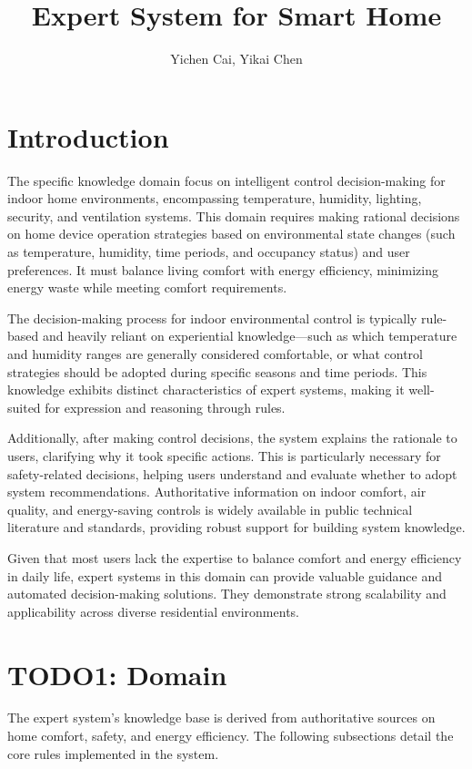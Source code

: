 \documentclass{article}
\title{Expert System for Smart Home}
\author{Yichen Cai, Yikai Chen}
\date{}
\begin{document}
\maketitle

\section{Introduction}

The specific knowledge domain focus on intelligent control decision-making for indoor home environments, encompassing temperature, humidity, lighting, security, and ventilation systems. This domain requires making rational decisions on home device operation strategies based on environmental state changes (such as temperature, humidity, time periods, and occupancy status) and user preferences. It must balance living comfort with energy efficiency, minimizing energy waste while meeting comfort requirements.

The decision-making process for indoor environmental control is typically rule-based and heavily reliant on experiential knowledge—such as which temperature and humidity ranges are generally considered comfortable, or what control strategies should be adopted during specific seasons and time periods. This knowledge exhibits distinct characteristics of expert systems, making it well-suited for expression and reasoning through rules.

Additionally, after making control decisions, the system explains the rationale to users, clarifying why it took specific actions. This is particularly necessary for safety-related decisions, helping users understand and evaluate whether to adopt system recommendations. Authoritative information on indoor comfort, air quality, and energy-saving controls is widely available in public technical literature and standards, providing robust support for building system knowledge.

Given that most users lack the expertise to balance comfort and energy efficiency in daily life, expert systems in this domain can provide valuable guidance and automated decision-making solutions. They demonstrate strong scalability and applicability across diverse residential environments.

\section{TODO1: Domain}

The expert system's knowledge base is derived from authoritative sources on home comfort, safety, and energy efficiency. The following subsections detail the core rules implemented in the system.
\end{document}
